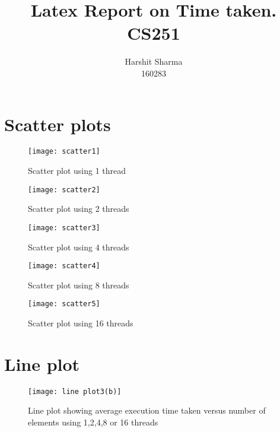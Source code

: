 \documentclass[a4paper, 10pt]{report}
\title{Latex Report on Time taken.\\CS251}
\author{Harshit Sharma\\160283}
\begin{document}
\maketitle

\chapter{Scatter plots}

\begin{figure}
\centering
\texttt{[image: scatter1]}
 \caption{Scatter plot using 1 thread}
 \label{fig:cc_get}
\end{figure}

\begin{figure}
\centering
\texttt{[image: scatter2]}
 \caption{Scatter plot using 2 threads}
 \label{fig:cc_get}
\end{figure}

\begin{figure}
\centering
\texttt{[image: scatter3]}
 \caption{Scatter plot using 4 threads}
 \label{fig:cc_get}
\end{figure}

\begin{figure}
\centering
\texttt{[image: scatter4]}
 \caption{Scatter plot using 8 threads}
 \label{fig:cc_get}
\end{figure}

\begin{figure}
\centering
\texttt{[image: scatter5]}
 \caption{Scatter plot using 16 threads}
 \label{fig:cc_get}
\end{figure}

\chapter{Line plot}

\begin{figure}
\centering
\texttt{[image: line plot3(b)]}
 \caption{Line plot showing average execution time taken versus number of elements using 1,2,4,8 or 16 threads}
\end{figure}
\end{document}
